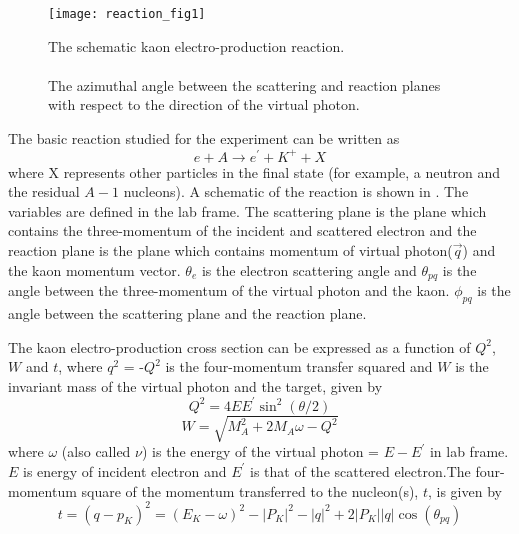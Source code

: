 \begin{figure}[!tbp]
\begin{center}
\addtolength{\figwidth}{-0.5in}
  \texttt{[image: reaction\_fig1]}
  \caption[The schematic kaon electro-production reaction.]{\label{fig:reaction_fig1}The schematic kaon electro-production reaction.\\\\ The azimuthal angle between the scattering and reaction planes with respect to the direction of the virtual photon.}
\end{center}
\end{figure}


%
%
The basic reaction studied for the experiment can be written as 
\begin{equation}
e + A \rightarrow e^\prime + K^+ + X
\end{equation}
\noindent
where X represents other particles in the final state (for example, a neutron and the residual $A-1$ nucleons).
A schematic of the reaction is shown in . The variables are defined in the lab frame. The scattering plane is the plane which contains the three-momentum of the incident and scattered electron and the reaction plane is the plane which contains momentum of virtual photon($\vec{q}$) and the kaon momentum vector. $\theta_e$ is the electron scattering angle and $\theta_{pq}$ is the angle between the three-momentum of the virtual photon and the kaon. $\phi_{pq}$ is the angle between the scattering plane and the reaction plane.

The kaon electro-production cross section can be expressed as a function of $Q^2$, $W$ and $t$, where $q^2$ = -$Q^2$ is the four-momentum transfer squared and $W$ is the invariant mass of the virtual photon and the target, given by
\begin{equation}
Q^2 = 4EE^\prime \sin^2(\theta/2)
\end{equation}
\begin{equation}
W = \sqrt{M_A^2 + 2M_A\omega - Q^2}
\end{equation}
where $\omega$ (also called $\nu$) is the energy of the virtual photon = $E - E^\prime$ in lab frame. $E$ is energy of incident electron and $E^\prime$ is that of the scattered electron.The four-momentum square of the momentum transferred to the nucleon(s), $t$, is given by
\begin{equation}
t = (q-p_K)^2 = (E_K -\omega)^2 - \left|P_K\right|^2- \left|q\right|^2 +2\left|P_K\right|\left|q\right|\cos(\theta_{pq})
\end{equation}

